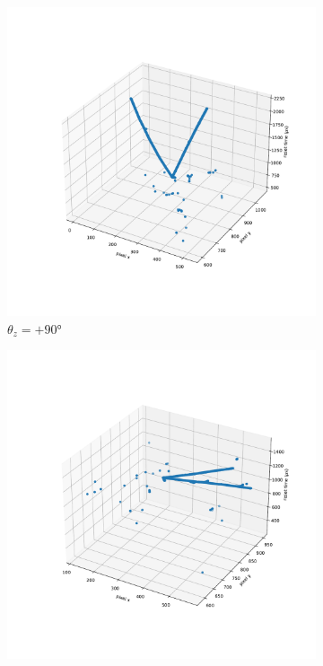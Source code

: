 \begin{figure}
\centering
\begin{subfigure}{.5\textwidth}
  \centering
  \includegraphics[width=\textwidth]{images/example_zdir_scatter.pdf}
  \caption{$\theta_{z} = +90$\unit{\degree}}
\end{subfigure}%
\begin{subfigure}{.5\textwidth}
  \centering
  \includegraphics[width=\textwidth]{images/example_xdir_scatter.pdf}

\end{subfigure}
\end{figure}
